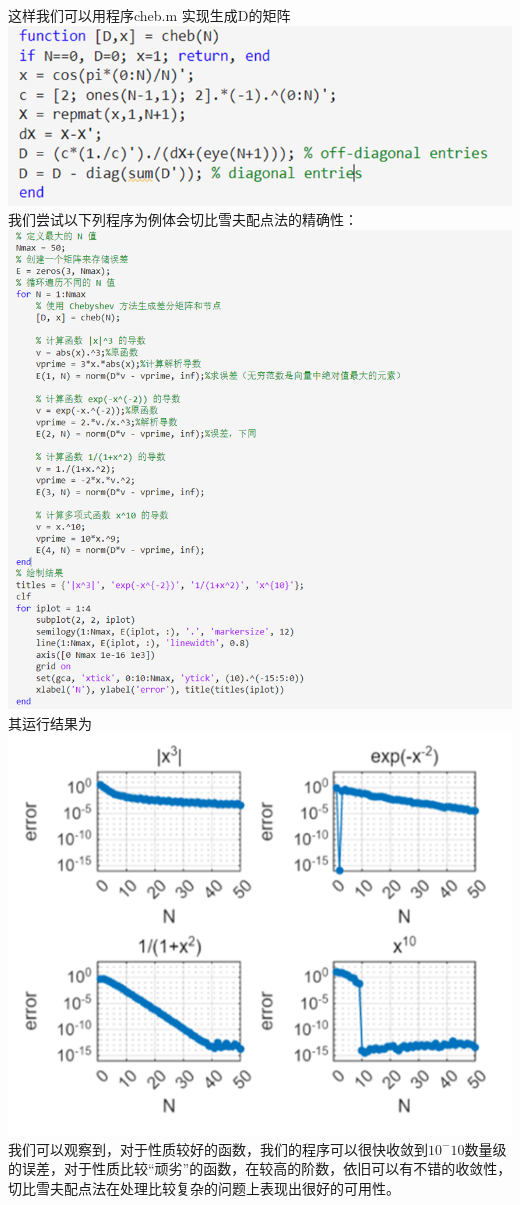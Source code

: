 \documentclass[12pt]{ctexart}
\numberwithin{equation}{section} %
\begin{document}
   这样我们可以用程序cheb.m 实现生成D的矩阵\\
   \includegraphics[width=1\textwidth]{程序图.png}\\
   我们尝试以下列程序为例体会切比雪夫配点法的精确性：\\
   \includegraphics[width=1\textwidth]{程序图2.png}\\
   其运行结果为\\
\includegraphics[width=1\textwidth]{运行结果图.png}\\
   我们可以观察到，对于性质较好的函数，我们的程序可以很快收敛到$10^-10$数量级的误差，对于性质比较“顽劣”的函数，在较高的阶数，依旧可以有不错的收敛性，切比雪夫配点法在处理比较复杂的问题上表现出很好的可用性。
\end{document}
